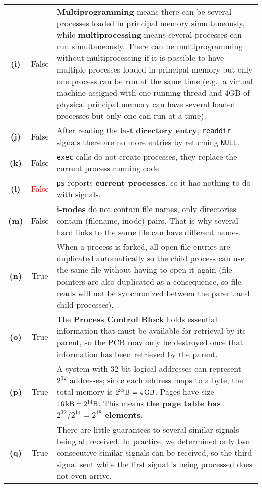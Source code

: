 {\begin{center}
\begin{longtable}{c | c p{132mm}}
        \textbf{(i)} & False & \textbf{Multiprogramming} means there can be several processes loaded in principal memory simultaneously, while \textbf{multiprocessing} means several processes can run simultaneously. There can be multiprogramming without multiprocessing if it is possible to have multiple processes loaded in principal memory but only one process can be run at the same time (e.g., a virtual machine assigned with one running thread and 4GB of physical principal memory can have several loaded processes but only one can run at a time). \\
        \textbf{(j)} & False & After reading the last \textbf{directory entry}, \texttt{readdir} signals there are no more entries by returning \texttt{NULL}. \\
        \textbf{(k)} & False & \texttt{exec} calls do not create processes, they replace the current process running code. \\
        \textbf{(l)} & \textcolor{red}{False} & \texttt{ps} reports \textbf{current processes}, so it has nothing to do with signals. \\
        \textbf{(m)} & False & \textbf{i-nodes} do not contain file names, only directories contain (filename, inode) pairs. That is why several hard links to the same file can have different names. \\
        \textbf{(n)} & True & When a process is forked, all open file entries are duplicated automatically so the child process can use the same file without having to open it again (file pointers are also duplicated as a consequence, so file reads will not be synchronized between the parent and child processes). \\
        \textbf{(o)} & True & The \textbf{Process Control Block} holds essential information that must be available for retrieval by its parent, so the PCB may only be destroyed once that information has been retrieved by the parent. \\
        \textbf{(p)} & True & A system with 32-bit logical addresses can represent $2^{32}$ addresses; since each address maps to a byte, the total memory is $2^{32}\SI{}{\byte}=\SI{4}{\giga \byte}$. Pages have size $\SI{16}{\kilo \byte}=2^{14}\SI{}{\byte}$. This means \textbf{the page table has $2^{32}/2^{14}=2^{18}$ elements}. \\
        \textbf{(q)} & True & There are little guarantees to several similar signals being all received. In practice, we determined only two consecutive similar signals can be received, so the third signal sent while the first signal is being processed does not even arrive. \\

\end{longtable}
\end{center}}
